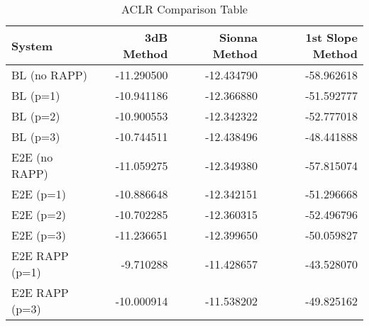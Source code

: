 \begin{table}
\caption{ACLR Comparison Table}
\label{tab:aclr_table}
\begin{tabular}{lrrr}
\toprule
System & 3dB Method & Sionna Method & 1st Slope Method \\
\midrule
BL (no RAPP) & -11.290500 & -12.434790 & -58.962618 \\
BL (p=1) & -10.941186 & -12.366880 & -51.592777 \\
BL (p=2) & -10.900553 & -12.342322 & -52.777018 \\
BL (p=3) & -10.744511 & -12.438496 & -48.441888 \\
E2E (no RAPP) & -11.059275 & -12.349380 & -57.815074 \\
E2E (p=1) & -10.886648 & -12.342151 & -51.296668 \\
E2E (p=2) & -10.702285 & -12.360315 & -52.496796 \\
E2E (p=3) & -11.236651 & -12.399650 & -50.059827 \\
E2E RAPP (p=1) & -9.710288 & -11.428657 & -43.528070 \\
E2E RAPP (p=3) & -10.000914 & -11.538202 & -49.825162 \\
\bottomrule
\end{tabular}
\end{table}
